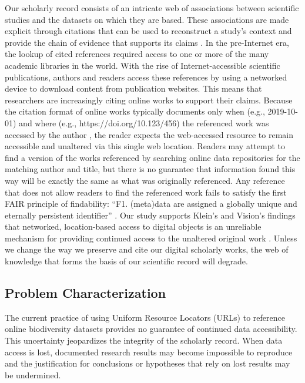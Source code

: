 Our scholarly record consists of an intricate web of associations between scientific studies and the datasets on which they are based. These associations are made explicit through citations that can be used to reconstruct a study's context and provide the chain of evidence that supports its claims \citep{Garfield_1964}. In the pre-Internet era, the lookup of cited references required access to one or more of the many academic libraries in the world. With the rise of Internet-accessible scientific publications, authors and readers access these references by using a networked device to download content from publication websites. This means that researchers are increasingly citing online works to support their claims. Because the citation format of online works typically documents only when (e.g., 2019-10-01) and where (e.g., https://doi.org/10.123/456) the referenced work was accessed by the author , the reader expects the web-accessed resource to remain accessible and unaltered via this single web location. Readers may attempt to find a version of the works referenced by searching online data repositories for the matching author and title, but there is no guarantee that information found this way will be exactly the same as what was originally referenced. Any reference that does not allow readers to find the referenced work fails to satisfy the first FAIR principle of findability: ``F1. (meta)data are assigned a globally unique and eternally persistent identifier'' \citep{Wilkinson_2016}. Our study supports Klein’s and Vision’s findings that networked, location-based access to digital objects is an unreliable mechanism for providing continued access to the unaltered original work \citep{Vision_2010,Klein_2014}. Unless we change the way we preserve and cite our digital scholarly works, the web of knowledge that forms the basis of our scientific record will degrade.

\subsection*{Problem Characterization}
The current practice of using Uniform Resource Locators (URLs) \citep{rfc1738} to reference online biodiversity datasets provides no guarantee of continued data accessibility. This uncertainty jeopardizes the integrity of the scholarly record. When data access is lost, documented research results may become impossible to reproduce and the justification for conclusions or hypotheses that rely on lost results may be undermined.

